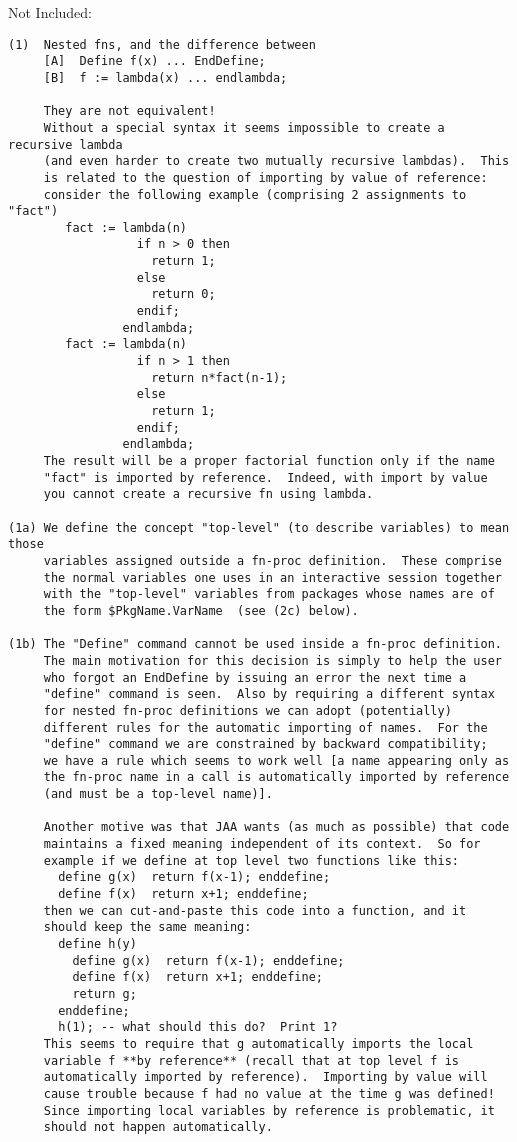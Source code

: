 \documentclass{book}[12,a4paper]
\def\refandpage#1{{\ref{#1}, pg.\pageref{#1}}}
\begin{document}
Not Included: %
\begin{verbatim}
(1)  Nested fns, and the difference between
     [A]  Define f(x) ... EndDefine;
     [B]  f := lambda(x) ... endlambda;

     They are not equivalent!
     Without a special syntax it seems impossible to create a recursive lambda
     (and even harder to create two mutually recursive lambdas).  This
     is related to the question of importing by value of reference:
     consider the following example (comprising 2 assignments to "fact")
        fact := lambda(n)
                  if n > 0 then
                    return 1;
                  else
                    return 0;
                  endif;
                endlambda;
        fact := lambda(n)
                  if n > 1 then
                    return n*fact(n-1);
                  else
                    return 1;
                  endif;
                endlambda;
     The result will be a proper factorial function only if the name
     "fact" is imported by reference.  Indeed, with import by value
     you cannot create a recursive fn using lambda.

(1a) We define the concept "top-level" (to describe variables) to mean those
     variables assigned outside a fn-proc definition.  These comprise
     the normal variables one uses in an interactive session together
     with the "top-level" variables from packages whose names are of
     the form $PkgName.VarName  (see (2c) below).

(1b) The "Define" command cannot be used inside a fn-proc definition.
     The main motivation for this decision is simply to help the user
     who forgot an EndDefine by issuing an error the next time a
     "define" command is seen.  Also by requiring a different syntax
     for nested fn-proc definitions we can adopt (potentially)
     different rules for the automatic importing of names.  For the
     "define" command we are constrained by backward compatibility;
     we have a rule which seems to work well [a name appearing only as
     the fn-proc name in a call is automatically imported by reference
     (and must be a top-level name)].

     Another motive was that JAA wants (as much as possible) that code
     maintains a fixed meaning independent of its context.  So for
     example if we define at top level two functions like this:
       define g(x)  return f(x-1); enddefine;
       define f(x)  return x+1; enddefine;
     then we can cut-and-paste this code into a function, and it
     should keep the same meaning:
       define h(y)
         define g(x)  return f(x-1); enddefine;
         define f(x)  return x+1; enddefine;
         return g;
       enddefine;
       h(1); -- what should this do?  Print 1?
     This seems to require that g automatically imports the local
     variable f **by reference** (recall that at top level f is
     automatically imported by reference).  Importing by value will
     cause trouble because f had no value at the time g was defined!
     Since importing local variables by reference is problematic, it
     should not happen automatically.


\end{verbatim}
\end{document}
